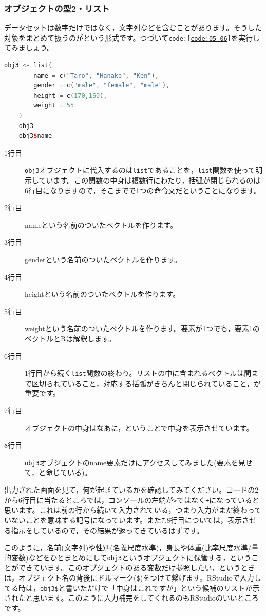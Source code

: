 \documentclass{ltjsbook}
\begin{document}
\subsubsection{オブジェクトの型2・リスト}
データセットは数字だけではなく，文字列などを含むことがあります。そうした対象をまとめて扱うのがという形式です。つづいて\texttt{code:\ref{code:05_06}}を実行してみましょう。
\begin{lstlisting}[language=c++,label={code:05_06},caption={リスト型}]
	obj3 <- list(
		name = c("Taro", "Hanako", "Ken"),
		gender = c("male", "female", "male"),
		height = c(170,160),
		weight = 55
	)
	obj3
	obj3$name
\end{lstlisting}
\begin{description}
	\item[1行目] \texttt{obj3}オブジェクトに代入するのは\texttt{list}であることを，\texttt{list}関数を使って明示しています。この関数の中身は複数行にわたり，括弧が閉じられるのは6行目になりますので，そこまでで1つの命令文だということになります。
	\item[2行目] nameという名前のついたベクトルを作ります。
	\item[3行目] genderという名前のついたベクトルを作ります。
	\item[4行目] heightという名前のついたベクトルを作ります。
	\item[5行目] weightという名前のついたベクトルを作ります。要素が1つでも，要素1のベクトルとRは解釈します。
	\item[6行目] 1行目から続く\texttt{list}関数の終わり。リストの中に含まれるベクトルは間まで区切られていること，対応する括弧がきちんと閉じられていること，が重要です。
	\item[7行目] オブジェクトの中身はなあに，ということで中身を表示させています。
	\item[8行目] \texttt{obj3}オブジェクトのname要素だけにアクセスしてみました(要素を見せて，と命じている)。
\end{description}

出力された画面を見て，何が起きているかを確認してみてください。コードの2から6行目に当たるところでは，コンソールの左端が\verb|>|ではなく\verb|+|になっていると思います。これは前の行から続いて入力されている，つまり入力がまだ終わっていないことを意味する記号になっています。また7,8行目については，表示させる指示をしているので，その結果が返ってきているはずです。

このように，名前(文字列)や性別(名義尺度水準)，身長や体重(比率尺度水準/量的変数)などをひとまとめにして\texttt{obj3}というオブジェクトに保管する，ということができています。このオブジェクトのある変数だけ参照したい，というときは，オブジェクト名の背後にドルマーク(\verb|$|)をつけて繋げます。RStudioで入力してる時は，\verb|obj3$|と書いただけで「中身はこれですが」という候補のリストが示されたと思います。このように入力補完をしてくれるのもRStudioのいいところです。
\end{document}
